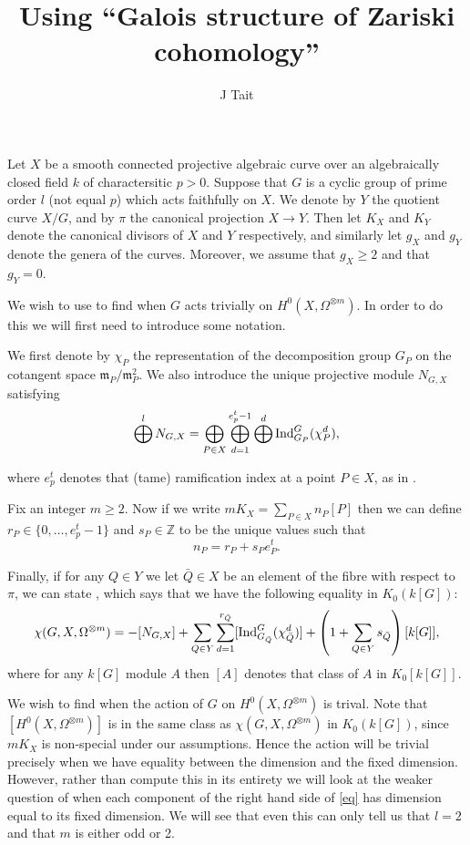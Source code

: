 \documentclass[11pt]{article} %
\title{Using ``Galois structure of Zariski cohomology''}
\author{J Tait}
\theoremstyle{remark}\newtheorem*{rem}{Remark}
\newcommand{\ZZ}{{\mathbb Z}}
\begin{document}
\maketitle
Let $X$ be a smooth connected projective algebraic curve over an algebraically closed field $k$ of charactersitic $p>0$.
Suppose that $G$ is a cyclic group of prime order $l$ (not equal $p$) which acts faithfully on $X$.
We denote by $Y$ the quotient curve $X/G$, and by $\pi$ the canonical projection $X\rightarrow Y$.
Then let $K_X$ and $K_Y$ denote the canonical divisors of $X$ and $Y$ respectively, and similarly let $g_X$ and $g_Y$ denote the genera of the curves.
Moreover, we assume that $g_X\geq 2$ and that $g_Y = 0$.


We wish to use \citep[Thm 4.5]{galiosstruc} to find when $G$ acts trivially on $H^0(X,\Omega^{\otimes m})$.
In order to do this we will first need to introduce some notation.

We first denote by $\chi_P$ the representation of the decomposition group $G_P$ on the cotangent space $\mathfrak{m}_P/\mathfrak{m}_P^2$.
We also introduce the unique projective module $N_{G,X}$ satisfying
\begin{equation*}
 \bigoplus^l N_{G,X} = \bigoplus_{P\in X} \bigoplus_{d=1}^{e^t_p-1} \bigoplus^d {\rm Ind}_{G_P}^G(\chi_P^d),
\end{equation*}

where $e^t_p$ denotes that (tame) ramification index at a point $P\in X$, as in \citep[Thm 4.3]{galiosstruc}.

Fix an integer $m\geq 2$. Now if we write $mK_X = \sum_{P\in X} n_P[P]$ then we can define $r_P\in \{0,\ldots, e^t_p - 1\}$ and $s_P\in \ZZ$ to be the unique values such that
\[
 n_P = r_P + s_Pe_P^t.
\]

Finally, if for any $Q\in Y$ we let $\bar Q \in X$ be an element of the fibre with respect to $\pi$, we can state \citep[Thm 4.5]{galiosstruc}, which says that we have the following equality in $K_0(k[G])$:
\begin{equation}\label{eq}
 \chi(G,X,\Omega^{\otimes m}) = -[N_{G,X}] +\sum_{Q\in Y}\sum^{r_{\bar Q}}_{d=1} [{\rm Ind}_{G_{\bar Q}}^G(\chi_{\bar Q}^d)]  + \left( 1 + \sum_{Q\in Y} s_{\bar Q} \right) [k[G]],
\end{equation}
where for any $k[G]$ module $A$ then $[A]$ denotes that class of $A$ in $K_0[k[G]]$.

We wish to find when the action of $G$ on $H^0(X,\Omega^{\otimes m})$ is trival.
Note that $[H^0(X,\Omega^{\otimes m})]$ is in the same class as $\chi(G,X,\Omega^{\otimes m})$ in $K_0(k[G])$, since $mK_X$ is non-special under our assumptions.
Hence the action will be trivial precisely when we have equality between the dimension and the fixed dimension.
However, rather than compute this in its entirety we will look at the weaker question of when each component of the right hand side of \ref{eq} has dimension equal to its fixed dimension.
We will see that even this can only tell us that $l=2$ and that $m$ is either odd or 2.
\end{document}

